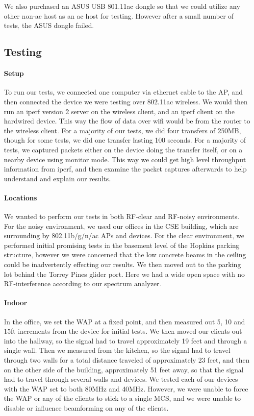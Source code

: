 We also purchased an ASUS USB 801.11ac dongle so that we could utilize any other
non-ac host as an ac host for testing. However after a small number of tests,
the ASUS dongle failed.

\subsection{Testing}

\paragraph{Setup}
To run our tests, we connected one computer via ethernet cable to the AP, and
then connected the device we were testing over 802.11ac wireless. We would then
run an iperf version 2  server on the wireless client, and
an iperf client on the hardwired device. This way the flow of data over wifi
would be from the router to the wireless client. For a majority of our tests, we
did four transfers of 250MB, though for some tests, we did one transfer lasting
100 seconds. For a majority of tests, we captured packets either on the device
doing the transfer itself, or on a nearby device using monitor mode. This way
we could get high level throughput information from iperf, and then examine the
packet captures afterwards to help understand and explain our results.

\paragraph{Locations}
We wanted to perform our tests in both RF-clear and RF-noisy environments. For
the noisy environment, we used our offices in the CSE building, which are
surrounding by 802.11b/g/n/ac APs and devices. For the clear environment, we
performed initial promising tests in the basement level of the Hopkins parking
structure, however we were concerned that the low concrete beams in the ceiling
could be inadvertently effecting our results. We then moved out to the parking
lot behind the Torrey Pines glider port. Here we had a wide open space with no
RF-interference according to our spectrum analyzer.


\paragraph{Indoor}
In the office, we set the WAP at a fixed point, and then measured out 5, 10 and
15ft increments from the device for initial tests. We then moved our clients out
into the hallway, so the signal had to travel approximately 19 feet and through
a single wall. Then we measured from the kitchen, so the signal had to travel
through two walls for a total distance traveled of approximately 23 feet, and
then on the other side of the building, approximately 51 feet away, so that the
signal had to travel through several walls and devices. We tested each of our
devices with the WAP set to both 80MHz and 40MHz.  However, we were unable to
force the WAP or any of the clients to stick to a single MCS, and we were unable
to disable or influence beamforming on any of the clients.


